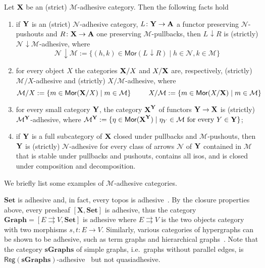 \documentclass[3p]{elsarticle}
\newcommand{\cat}[1]{\ensuremath{\mathbf{#1}}}
\def\X{\textbf {\textup{X}}}
\def\Y{\textbf {\textup{Y}}}
\def\A{\textbf {\textup{A}}}
\renewcommand{\comma}[2]{#1\hspace{1pt} {\downarrow}#2}
\newcommand{\mor}{\mathsf{Mor}}
\newcommand{\reg}{\mathsf{Reg}}
\theoremstyle{remark}
\theoremstyle{definition}
\begin{document}
\begin{thm}
	\label{thm:slice-functors}
	Let $\X$ be an (strict) $\mathcal{M}$-adhesive category. Then the following facts hold
	\begin{enumerate}
		\item if $\Y$ is an (strict) $\mathcal{N}$-adhesive category, $L\colon \Y\to \A$ a functor preserving $\mathcal{N}$-pushouts and $R\colon \X\to \A$ one preserving $\mathcal{M}$-pullbacks, then $\comma{L}{R}$ is (strictly) $\comma{\mathcal{N}}{\mathcal{M}}$-adhesive, where
		\[\comma{\mathcal{N}}{\mathcal{M}}:=\{(h,k) \in \mor(\comma{L}{R}) \mid h\in \mathcal{N}, k\in \mathcal{M}\}\]
		\item for every object $X$
		the categories $\X/X$  and $X/\X$ are, respectively, (strictly) $\mathcal{M}/X$-adhesive and (strictly) $X/\mathcal{M}$-adhesive, where
		\[\mathcal{M}/X:=\{m\in \mor(\X/X) \mid m\in
		\mathcal{M}\} \hspace{25pt} X/\mathcal{M}:=\{m\in \mor(X/\X) \mid m\in \mathcal{M}\}\]
		\item for every small category $\Y$, the category $\X^\Y$ of
		functors $\Y\to \X$ is (strictly) $\mathcal{M}^{\Y}$-adhesive, where
		$\mathcal{M}^{\Y}:=\{\eta \in \mor(\X^\Y) \mid \eta_Y \in
		\mathcal{M} \text{ for every } Y\in \Y\}$;
		\item if $\Y$ is a full subcategory of $\X$ closed under pullbacks and $\mathcal{M}$-pushouts, then $\Y$ is (strictly) $\mathcal{N}$-adhesive for every class of arrows $\mathcal{N}$ of $\Y$ contained in $\mathcal{M}$ that is stable under pullbacks and pushouts, contains all isos, and is closed under composition and decomposition.
	\end{enumerate} 
\end{thm}

We briefly list some examples of $\mathcal{M}$-adhesive categories.

\begin{exa}
	\label{ex:adhesive}
	$\cat{Set}$ is adhesive and, in fact, every topos is
	adhesive~\cite{lack2006toposes}. By the closure properties above, every presheaf $[\cat{X},\cat{Set}]$ is adhesive, thus the category
	$\cat{Graph} = [ E \rightrightarrows V, \cat{Set}]$ is adhesive
	where $E \rightrightarrows {V}$ is the two objects category with two
	morphisms $s,t \colon{E} \to {V}$. Similarly, various
	categories of hypergraphs can be shown to be adhesive, such as term
	graphs and hierarchical graphs~\cite{CastelnovoGM24}. Note that the category $\cat{sGraphs}$ of simple graphs, 
	i.e.~graphs without parallel edges, is
	$\reg{(\cat{sGraphs})}$-adhesive~\cite{BehrHK23} but not
	quasiadhesive.
\end{exa}
\end{document}
